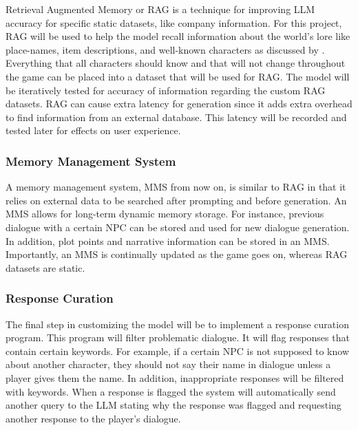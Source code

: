 \documentclass[10pt,twocolumn]{article}
\begin{document}
            \par 
            Retrieval Augmented Memory or RAG is a technique for improving LLM accuracy for specific static datasets, like company information. For this project, RAG will be used to help the model recall information about the world's lore like place-names, item descriptions, and well-known characters as discussed by \textcite{kostilainen_next_2024}. Everything that all characters should know and that will not change throughout the game can be placed into a dataset that will be used for RAG. The model will be iteratively tested for accuracy of information regarding the custom RAG datasets. RAG can cause extra latency for generation since it adds extra overhead to find information from an external database. This latency will be recorded and tested later for effects on user experience. 

        \subsubsection{Memory Management System}

            \par 
            A memory management system, MMS from now on, is similar to RAG in that it relies on external data to be searched after prompting and before generation. An MMS allows for long-term dynamic memory storage. For instance, previous dialogue with a certain NPC can be stored and used for new dialogue generation. In addition, plot points and narrative information can be stored in an MMS. Importantly, an MMS is continually updated as the game goes on, whereas RAG datasets are static. 

        \subsubsection{Response Curation}

            \par 
            The final step in customizing the model will be to implement a response curation program. This program will filter problematic dialogue. It will flag responses that contain certain keywords. For example, if a certain NPC is not supposed to know about another character, they should not say their name in dialogue unless a player gives them the name. In addition, inappropriate responses will be filtered with keywords. When a response is flagged the system will automatically send another query to the LLM stating why the response was flagged and requesting another response to the player's dialogue. 
        
\end{document}
